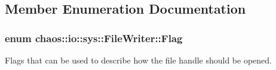 \subsection{Member Enumeration Documentation}
\hypertarget{classchaos_1_1io_1_1sys_1_1_file_writer_aafcaef6dd3171373d8dfadadcc3c1b0b}{
\subsubsection[{Flag}]{\setlength{\rightskip}{0pt plus 5cm}enum {\bf chaos\-::io\-::sys\-::\-File\-Writer\-::\-Flag}}}\label{classchaos_1_1io_1_1sys_1_1_file_writer_aafcaef6dd3171373d8dfadadcc3c1b0b}


Flags that can be used to describe how the file handle should be opened. 

